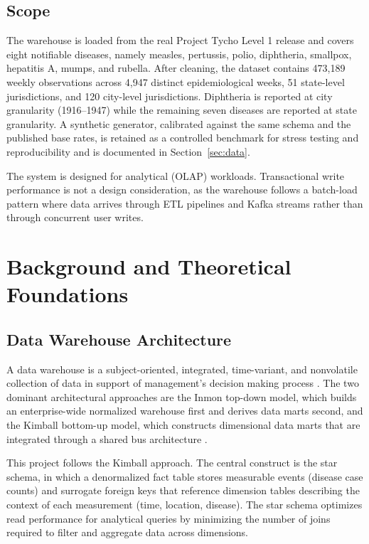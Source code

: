 \documentclass[12pt,a4paper]{article}
\begin{document}
\subsection{Scope}

The warehouse is loaded from the real Project Tycho Level 1 release and covers eight notifiable diseases, namely measles, pertussis, polio, diphtheria, smallpox, hepatitis A, mumps, and rubella. After cleaning, the dataset contains 473{,}189 weekly observations across 4{,}947 distinct epidemiological weeks, 51 state-level jurisdictions, and 120 city-level jurisdictions. Diphtheria is reported at city granularity (1916--1947) while the remaining seven diseases are reported at state granularity. A synthetic generator, calibrated against the same schema and the published base rates, is retained as a controlled benchmark for stress testing and reproducibility and is documented in Section~\ref{sec:data}.

The system is designed for analytical (OLAP) workloads. Transactional write performance is not a design consideration, as the warehouse follows a batch-load pattern where data arrives through ETL pipelines and Kafka streams rather than through concurrent user writes.


\section{Background and Theoretical Foundations}
\label{sec:background}

\subsection{Data Warehouse Architecture}

A data warehouse is a subject-oriented, integrated, time-variant, and nonvolatile collection of data in support of management's decision making process \cite{inmon2005}. The two dominant architectural approaches are the Inmon top-down model, which builds an enterprise-wide normalized warehouse first and derives data marts second, and the Kimball bottom-up model, which constructs dimensional data marts that are integrated through a shared bus architecture \cite{kimball2013}.

This project follows the Kimball approach. The central construct is the star schema, in which a denormalized fact table stores measurable events (disease case counts) and surrogate foreign keys that reference dimension tables describing the context of each measurement (time, location, disease). The star schema optimizes read performance for analytical queries by minimizing the number of joins required to filter and aggregate data across dimensions.
\end{document}
